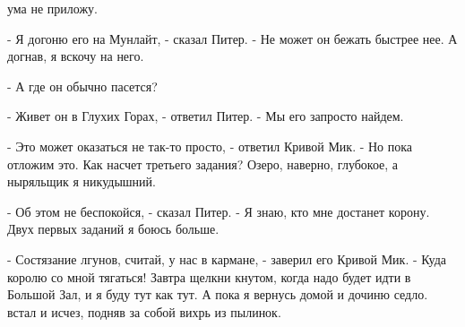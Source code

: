 ума не приложу.
\par- Я догоню его на Мунлайт, - сказал Питер. - Не может он бежать 
быстрее нее. А догнав, я вскочу на него.
\par- А где он обычно пасется?
\par- Живет он в Глухих Горах, - ответил Питер. - Мы его запросто 
найдем.
\par- Это может оказаться не так-то просто, - ответил Кривой Мик. - Но 
пока отложим это. Как насчет третьего задания? Озеро, наверно, 
глубокое, а ныряльщик я никудышний.
\par- Об этом не беспокойся, - сказал Питер. - Я знаю, кто мне 
достанет корону. Двух первых заданий я боюсь больше.
\par- Состязание лгунов, считай, у нас в кармане, - заверил его Кривой 
Мик. - Куда королю со мной тягаться! Завтра щелкни кнутом, когда надо 
будет идти в Большой Зал, и я буду тут как тут. А пока я вернусь домой 
и дочиню седло.
 встал и исчез, подняв за собой вихрь из пылинок.
